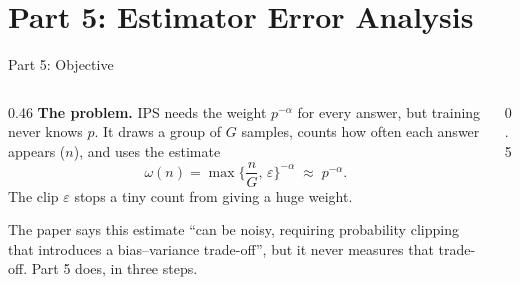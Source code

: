\documentclass[aspectratio=169,10pt]{beamer}
\newcommand{\hit}[1]{\textcolor{mOrange}{\textbf{#1}}}
\begin{document}
\section{Part 5: Estimator Error Analysis}

\begin{frame}{Part 5: Objective}

\begin{columns}[T,onlytextwidth]
\begin{column}{0.46\textwidth}
\footnotesize
\textbf{The problem.} IPS needs the weight $p^{-\alpha}$ for every answer, but
training never knows $p$. It draws a group of $G$ samples, counts how often each
answer appears ($n$), and uses the estimate
\[
  \omega(n)=\max\Big\{\frac{n}{G},\,\varepsilon\Big\}^{-\alpha}\;\approx\;p^{-\alpha}.
\]
The clip $\varepsilon$ stops a tiny count from giving a huge weight.

\medskip
The paper says this estimate ``can be noisy, requiring probability clipping that
introduces a bias--variance trade-off'', but it never measures that trade-off.
Part 5 does, in three steps.
\end{column}

\begin{column}{0.5\textwidth}
\centering
\vspace{1mm}
\end{column}
\end{columns}
\end{frame}
\end{document}

